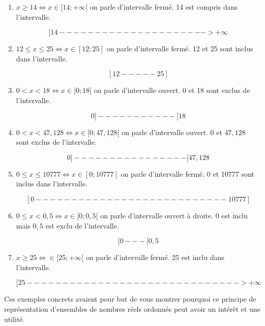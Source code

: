 \documentclass[a4paper, 11pt, twoside]{article}
\begin{document}
\begin{enumerate}
\item \(x \geq 14 \iff x\in [14; +\infty [\) on parle d'intervalle
fermé. 14 est compris dans l'intervalle.

\[[14--------------------->+\infty\]

\item \(12 \leq x \leq 25\iff x\in [12; 25]\) on parle d'intervalle
fermé. 12 et 25 sont inclus dans l'intervalle.

\[[12-----25]\]

\item \(0 < x < 18\iff x\in ]0; 18[\) on parle d'intervalle ouvert.
0 et 18 sont exclus de l'intervalle.

\[0]-----------[18\]

\item \(0 < x < 47,128\iff x\in ]0; 47,128[\) on parle d'intervalle
ouvert. \(0\) et \(47,128\) sont exclus de l'intervalle.

\[0]----------------[47,128\]

\item \(0\leq x \leq 10 777\iff x\in [0; 10777]\) on parle d'intervalle
fermé. 0 et 10777 sont inclus dans l'intervalle.

\[[0---------------------------10777]\]

\item \(0 \leq x < 0,5\iff x\in [0; 0,5[\) on parle d'intervalle ouvert
à droite. \(0\) est inclu mais \(0,5\) est exclu de l'intervalle.

\[[0---[0,5\]

\item \(x \geq 25\iff \in [25; +\infty[\) on parle d'intervalle
fermé. 25 est inclu dans l'intervalle.

\[[25------------------------------>+\infty\]
\end{enumerate}


Ces exemples concrets avaient pour but de vous montrer pourquoi ce
principe de représentation d'ensembles de nombres réels ordonnés
peut avoir un intérêt et une utilité.
\end{document}
